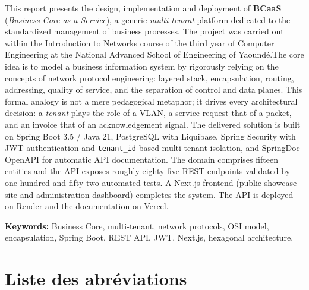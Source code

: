 \documentclass[11pt,a4paper,oneside]{report}
\begin{document}
This report presents the design, implementation and deployment of \textbf{BCaaS}
(\emph{Business Core as a Service}), a generic \emph{multi-tenant} platform dedicated to
the standardized management of business processes. The project was carried out within the
Introduction to Networks course of the third year of Computer Engineering at the National
Advanced School of Engineering of Yaoundé.The core idea is to model a business information system by rigorously relying on the
concepts of network protocol engineering: layered stack, encapsulation, routing,
addressing, quality of service, and the separation of control and data planes. This formal
analogy is not a mere pedagogical metaphor; it drives every architectural decision: a
\emph{tenant} plays the role of a VLAN, a service request that of a packet, and an
invoice that of an acknowledgement signal. The delivered solution is built on Spring Boot 3.5 / Java 21, PostgreSQL with Liquibase,
Spring Security with JWT authentication and \texttt{tenant\_id}-based multi-tenant
isolation, and SpringDoc OpenAPI for automatic API documentation. The domain comprises
fifteen entities and the API exposes roughly eighty-five REST endpoints validated by one
hundred and fifty-two automated tests. A Next.js frontend (public showcase site and
administration dashboard) completes the system. The API is deployed on Render and the
documentation on Vercel.

\vspace{6pt}
\noindent\textbf{Keywords:} Business Core, multi-tenant, network protocols, OSI model,
encapsulation, Spring Boot, REST API, JWT, Next.js, hexagonal architecture.

\cleardoublepage
\tableofcontents
\cleardoublepage
\listoffigures
\cleardoublepage
\listoftables

\chapter*{Liste des abréviations}
\end{document}
